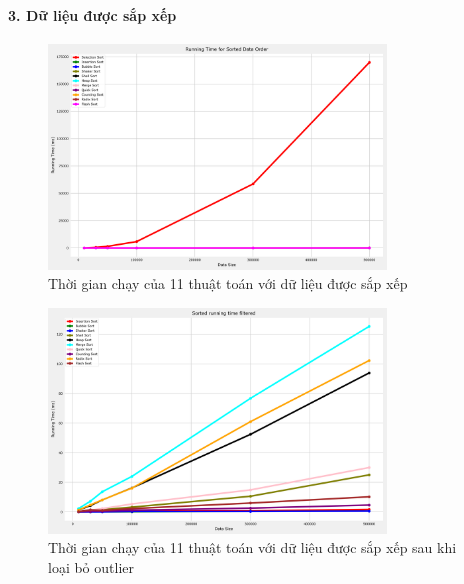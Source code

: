 \paragraph{3. Dữ liệu được sắp xếp}
\begin{figure}[H]
    \centering
    \includegraphics[width=0.8\textwidth]{img/results/sorted_running_time.png}
    \caption{Thời gian chạy của 11 thuật toán với dữ liệu được sắp xếp}
\end{figure}

\begin{figure}[H]
    \centering
    \includegraphics[width=0.8\textwidth]{img/results/sorted_running_time_filtered.png}
    \caption{Thời gian chạy của 11 thuật toán với dữ liệu được sắp xếp sau khi loại bỏ outlier}
\end{figure}




